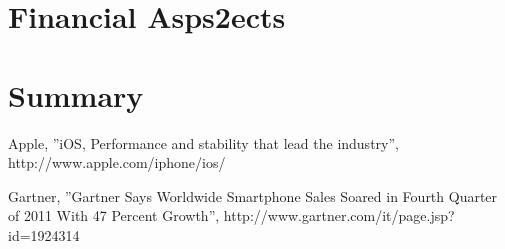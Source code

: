 \documentclass[conference]{IEEEtran}
\begin{document}
\section{Financial Asps2ects}

\section{Summary}


\begin{thebibliography}{1}

Apple, ''iOS, Performance and stability that lead the industry'', http://www.apple.com/iphone/ios/

Gartner, ''Gartner Says Worldwide Smartphone Sales Soared in Fourth Quarter of 2011 With 47 Percent Growth'', http://www.gartner.com/it/page.jsp?id=1924314



\end{thebibliography}
\end{document}
